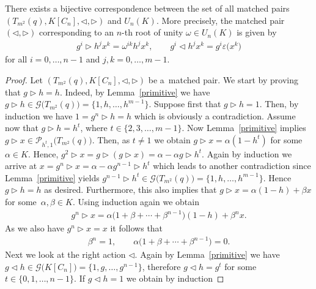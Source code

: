 \begin{Proposition} \label{mapex1}
There exists a bijective correspondence between the set of all matched pairs $(T_{m^{2}}(q), K[C_n], \triangleleft, \triangleright)$ and $U_n (K)$. More precisely, the matched pair $(\triangleleft, \triangleright)$ corresponding to an $n$-th root of unity $\omega \in U_n (K)$ is given by
\begin{gather}\label{mp}
g^{i} \triangleright h^{j} x^{k} = \omega^{ik} h^{j} x^{k}, \qquad g^{i} \triangleleft h^{j} x^{k} = g^{i} \varepsilon\big(x^{k}\big)
\end{gather}
for all $i = 0,\dots, n-1$ and $j, k = 0,\dots, m-1$.
\end{Proposition}

\begin{proof} Let $(T_{m^{2}}(q), K[C_n], \triangleleft, \triangleright)$ be a~matched pair. We start by proving that $g \triangleright h = h$.
Indeed, by Lemma~\ref{primitive} we have $g \triangleright h \in \mathcal{G}\big(T_{m^{2}}(q)\big) = \{1, h,\dots,h^{m-1}\}$. Suppose first that $g \triangleright h = 1$. Then, by induction we have $1 = g^{n} \triangleright h = h$ which is obviously a contradiction. Assume now that $g \triangleright h = h^{t}$, where $t \in \{2, 3,\dots, m-1\}$. Now Lemma~\ref{primitive} implies $g \triangleright x \in \mathcal{P}_{h^{t}, 1}\big(T_{m^{2}}(q)\big)$. Then, as $t \neq 1$ we obtain $g \triangleright x = \alpha(1-h^{t})$ for some $\alpha \in K$. Hence, $g^{2} \triangleright x = g \triangleright (g \triangleright x) = \alpha - \alpha g \triangleright h^{t}$. Again by induction we arrive at $x = g^{n} \triangleright x = \alpha - \alpha g^{n-1} \triangleright h^{t}$ which leads to another contradiction since Lemma~\ref{primitive} yields $g^{n-1} \triangleright h^{t} \in \mathcal{G}\big(T_{m^{2}}(q)\big) = \{1, h,\dots,h^{m-1}\}$. Hence $g \triangleright h = h$ as desired. Furthermore, this
also implies that $g \triangleright x = \alpha(1-h)+ \beta x$ for some~$\alpha, \beta \in K$. Using induction again we obtain
\begin{gather*}
g^{n} \triangleright x = \alpha\big(1 + \beta + \cdots + \beta^{n-1}\big) (1-h) + \beta^{n} x.
\end{gather*}
As we also have $g^{n} \triangleright x = x$ it follows that
\begin{gather*}
\beta^{n} = 1, \qquad \alpha\big(1 + \beta + \cdots + \beta^{n-1}\big)=0.
\end{gather*}
Next we look at the right action $\triangleleft$. Again by Lemma~\ref{primitive} we have $g \triangleleft h \in \mathcal{G}\big(K[C_n]\big) = \{1, g,\dots, g^{n-1}\}$, therefore $g \triangleleft h = g^{t}$ for some $t \in \{0,1, \dots, n-1\}$. If $g \triangleleft h = 1$ we obtain by induction

\end{proof}
